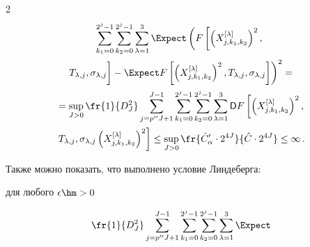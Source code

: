 \begin{multicols}{2}
\begin{multline*}
\sum\limits_{k_1 = 0}^{2^j - 1} \sum\limits_{k_2 = 0}^{2^j - 1}


\sum\limits_{\lambda = 1}^{3} \Expect


\left( F\left[\left(X_{j,k_1,k_2}^{[\lambda]}\right)^2,\right.\right.\\[1pt]


\left.\left.T_{\lambda,j},\sigma_{\lambda,j}


\vphantom{\left(X_{j,k_1,k_2}^{[\lambda]}\right)^2}\right]


-


\Expect  F\left[\left(X_{j,k_1,k_2}^{[\lambda]}\right)^2,T_{\lambda,j},


\sigma_{\lambda,j}\right]\right)^2


= {}


\\[1pt]


{}=\sup\limits_{J > 0} \fr{1}{D^2_J}\sum\limits_{j = p''J + 1}^{J - 1}


\sum\limits_{k_1 = 0}^{2^j - 1} \sum\limits_{k_2 = 0}^{2^j - 1}


\sum\limits_{\lambda = 1}^{3} \Variance


F\left[\left(X_{j,k_1,k_2}^{[\lambda]}\right)^2,\right.\\[1pt]


\left.T_{\lambda,j},\sigma_{\lambda,j}


\left(X_{j,k_1,k_2}^{[\lambda]}\right)^2\right]


\leq \sup\limits_{J > 0} \fr{\tilde{C}'_\alpha \cdot2^{4J}}{\hat{C}\cdot 2^{4J}}


\leq \infty\,.


\end{multline*}


%





Также можно показать, что выполнено условие Линдеберга:


для любого $\epsilon \hm> 0$





\noindent


\begin{multline}


\label{Norm_Cond2}


\fr{1}{D^2_J} \sum\limits_{j = p''J + 1}^{J - 1}


\sum\limits_{k_1=0}^{2^j - 1}\sum\limits_{k_2=0}^{2^j - 1}


\sum\limits_{\lambda = 1}^{3} \Expect



\end{multline}
\end{multicols}
